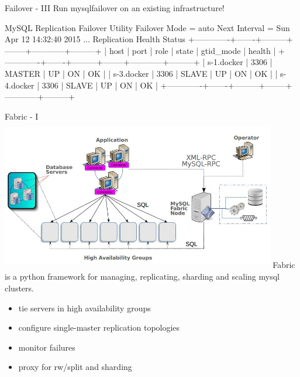 \documentclass{beamer}[10]
\begin{document}
\begin{pyframe}{Failover - III}
Run mysqlfailover on an existing infrastructure!

\begin{bashcode}
MySQL Replication Failover Utility
Failover Mode = auto     Next Interval = Sun Apr 12 14:32:40 2015
...
Replication Health Status
+-------------+-------+---------+--------+------------+---------+
| host        | port  | role    | state  | gtid_mode  | health  |
+-------------+-------+---------+--------+------------+---------+
| s-1.docker  | 3306  | MASTER  | UP     | ON         | OK      |
| s-3.docker  | 3306  | SLAVE   | UP     | ON         | OK      |
| s-4.docker  | 3306  | SLAVE   | UP     | ON         | OK      |
+-------------+-------+---------+--------+------------+---------+
\end{bashcode}
\end{pyframe}



%
%
\begin{pyframe}{Fabric - I}
\includegraphics[height=6.6cm,width=12cm]{images/mysql-fabric-hla.jpg}
Fabric is a python framework for managing, replicating, sharding and scaling mysql clusters.
\begin{itemize}
\item tie servers in high availability groups
\item configure single-master replication topologies
\item monitor failures
\item proxy for rw/split and sharding
\end{itemize}
\end{pyframe}
\end{document}
